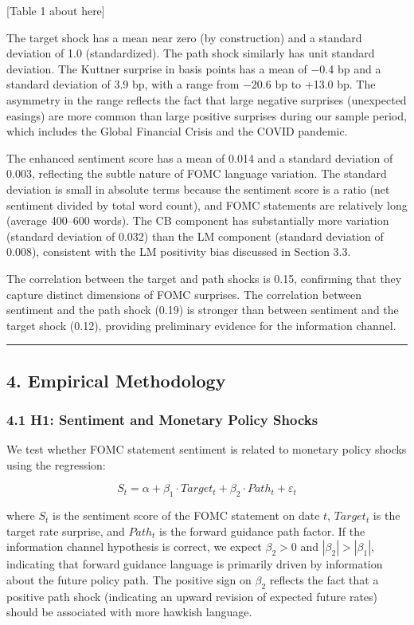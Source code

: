 \documentclass[
]{article}
\begin{document}
{[}Table 1 about here{]}

The target shock has a mean near zero (by construction) and a standard
deviation of 1.0 (standardized). The path shock similarly has unit
standard deviation. The Kuttner surprise in basis points has a mean of
−0.4 bp and a standard deviation of 3.9 bp, with a range from −20.6 bp
to +13.0 bp. The asymmetry in the range reflects the fact that large
negative surprises (unexpected easings) are more common than large
positive surprises during our sample period, which includes the Global
Financial Crisis and the COVID pandemic.

The enhanced sentiment score has a mean of 0.014 and a standard
deviation of 0.003, reflecting the subtle nature of FOMC language
variation. The standard deviation is small in absolute terms because the
sentiment score is a ratio (net sentiment divided by total word count),
and FOMC statements are relatively long (average 400--600 words). The CB
component has substantially more variation (standard deviation of 0.032)
than the LM component (standard deviation of 0.008), consistent with the
LM positivity bias discussed in Section 3.3.

The correlation between the target and path shocks is 0.15, confirming
that they capture distinct dimensions of FOMC surprises. The correlation
between sentiment and the path shock (0.19) is stronger than between
sentiment and the target shock (0.12), providing preliminary evidence
for the information channel.

\begin{center}\rule{0.5\linewidth}{0.5pt}\end{center}

\subsection{4. Empirical Methodology}\label{empirical-methodology}

\subsubsection{4.1 H1: Sentiment and Monetary Policy
Shocks}\label{h1-sentiment-and-monetary-policy-shocks}

We test whether FOMC statement sentiment is related to monetary policy
shocks using the regression:

\[S_t = \alpha + \beta_1 \cdot Target_t + \beta_2 \cdot Path_t + \varepsilon_t\]

where \(S_t\) is the sentiment score of the FOMC statement on date
\(t\), \(Target_t\) is the target rate surprise, and \(Path_t\) is the
forward guidance path factor. If the information channel hypothesis is
correct, we expect \(\beta_2 > 0\) and \(|\beta_2| > |\beta_1|\),
indicating that forward guidance language is primarily driven by
information about the future policy path. The positive sign on
\(\beta_2\) reflects the fact that a positive path shock (indicating an
upward revision of expected future rates) should be associated with more
hawkish language.
\end{document}
